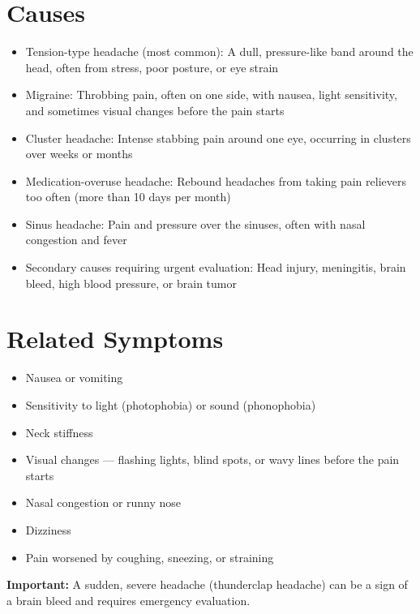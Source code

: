 \section*{Causes}
\begin{itemize}
  \item Tension-type headache (most common): A dull, pressure-like band around the head, often from stress, poor posture, or eye strain
  \item Migraine: Throbbing pain, often on one side, with nausea, light sensitivity, and sometimes visual changes before the pain starts
  \item Cluster headache: Intense stabbing pain around one eye, occurring in clusters over weeks or months
  \item Medication-overuse headache: Rebound headaches from taking pain relievers too often (more than 10 days per month)
  \item Sinus headache: Pain and pressure over the sinuses, often with nasal congestion and fever
  \item Secondary causes requiring urgent evaluation: Head injury, meningitis, brain bleed, high blood pressure, or brain tumor
\end{itemize}

\section*{Related Symptoms}
\begin{itemize}
  \item Nausea or vomiting
  \item Sensitivity to light (photophobia) or sound (phonophobia)
  \item Neck stiffness
  \item Visual changes — flashing lights, blind spots, or wavy lines before the pain starts
  \item Nasal congestion or runny nose
  \item Dizziness
  \item Pain worsened by coughing, sneezing, or straining
\end{itemize}
\textbf{Important:} A sudden, severe headache (thunderclap headache) can be a sign of a brain bleed and requires emergency evaluation.

